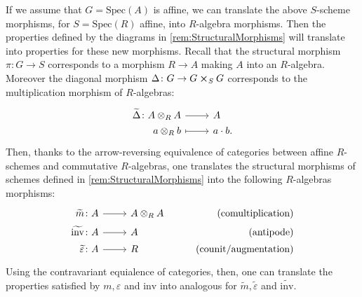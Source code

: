 \documentclass[../Main]{subfiles}
\begin{document}
\begin{rem}
	If we assume that $G = \mathrm{Spec}(A)$ is affine, we can translate the above $S$-scheme
	morphisms, for $S = \mathrm{Spec}(R)$ affine, into $R$-algebra morphisms.
	Then the properties defined by the diagrams in \cref{rem:StructuralMorphisms}
	will translate into properties for these new morphisms.
	Recall that the structural morphism $\pi\colon G \to S$ corresponds to a
	morphism $R \to A$ making $A$ into an $R$-algebra.
	Moreover the diagonal morphism $\Delta\colon G \to G \cross_{ S } G$ corresponds
	to the multiplication morphism of $R$-algebras:
	\begin{equation*}
	\begin{tikzcd}[row sep = 0ex
		,/tikz/column 1/.append style={anchor=base east}
		,/tikz/column 2/.append style={anchor=base west}]
		\widetilde{\Delta}\colon A \otimes_R A \arrow[r, "", rightarrow] &
		A \\
		a \otimes_R b \arrow[r, "", mapsto] & a \cdot b
	.\end{tikzcd}
	\end{equation*} 
	Then, thanks to the arrow-reversing equivalence of categories between
	affine $R$-schemes and commutative $R$-algebras, one translates the structural morphisms
	of schemes defined in \cref{rem:StructuralMorphisms} into the following $R$-algebras morphisms:
	\begin{equation*}
			\begin{tikzcd}[row sep = 0ex
         ,/tikz/column 1/.append style={anchor=base east}
         ,/tikz/column 2/.append style={anchor=base west}
         ,/tikz/column 3/.append style={anchor=base east}]
			\widetilde{m}\colon A \arrow[r, "", rightarrow] &
			A \otimes_R A & \text{(comultiplication)} \\
			\widetilde{\mathrm{inv}}\colon A \arrow[r, "", rightarrow] &
			A & \text{(antipode)} \\
			\widetilde{\varepsilon} \colon A \arrow[r, "", rightarrow] &
			R & \text{(counit/augmentation)} 
		\end{tikzcd}
	\end{equation*} 
	Using the contravariant equialence of categories, then,
	one can translate the properties satisfied by $m, \varepsilon$ and $\mathrm{inv}$
	into analogous for $\widetilde{m}, \widetilde{\varepsilon}$ and $\widetilde{\mathrm{inv}}$.
\end{rem}
\end{document}
